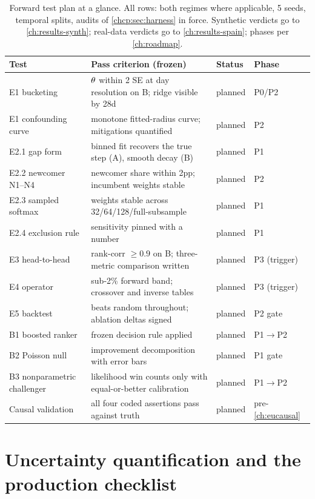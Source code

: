 \begin{table}[htbp]
\centering
\footnotesize
\begin{tabular}{lp{5.6cm}p{2.2cm}l}
\toprule
Test & Pass criterion (frozen) & Status & Phase \\
\midrule
E1 bucketing & $\theta$ within 2 SE at day resolution on B; ridge visible by 28d & planned & P0/P2 \\
E1 confounding curve & monotone fitted-radius curve; mitigations quantified & planned & P2 \\
E2.1 gap form & binned fit recovers the true step (A), smooth decay (B) & planned & P1 \\
E2.2 newcomer N1--N4 & newcomer share within 2pp; incumbent weights stable & planned & P2 \\
E2.3 sampled softmax & weights stable across 32/64/128/full-subsample & planned & P1 \\
E2.4 exclusion rule & sensitivity pinned with a number & planned & P1 \\
E3 head-to-head & rank-corr $\ge 0.9$ on B; three-metric comparison written & planned & P3 (trigger) \\
E4 operator & sub-2\% forward band; crossover and inverse tables & planned & P3 (trigger) \\
E5 backtest & beats random throughout; ablation deltas signed & planned & P2 gate \\
B1 boosted ranker & frozen decision rule applied & planned & P1$\to$P2 \\
B2 Poisson null & improvement decomposition with error bars & planned & P1 gate \\
B3 nonparametric challenger & likelihood win counts only with equal-or-better calibration & planned & P1$\to$P2 \\
Causal validation & all four coded assertions pass against truth & planned & pre-\cref{ch:eucausal} \\
\bottomrule
\end{tabular}
\caption{Forward test plan at a glance. All rows: both regimes where applicable, 5 seeds, temporal splits,
audits of \cref{chcp:sec:harness} in force. Synthetic verdicts go to \cref{ch:results-synth}; real-data
verdicts go to \cref{ch:results-spain}; phases per \cref{ch:roadmap}.}
\label{chcp:tab:forward}
\end{table}

\section{Uncertainty quantification and the production checklist}
\label{chcp:sec:uq}

